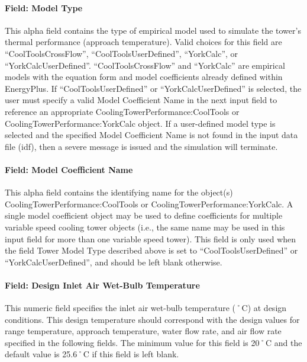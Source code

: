\paragraph{Field: Model Type}\label{field-model-type}

This alpha field contains the type of empirical model used to simulate the tower's thermal performance (approach temperature). Valid choices for this field are ``CoolToolsCrossFlow'', ``CoolToolsUserDefined'', ``YorkCalc'', or ``YorkCalcUserDefined''. ``CoolToolsCrossFlow'' and ``YorkCalc'' are empirical models with the equation form and model coefficients already defined within EnergyPlus. If ``CoolToolsUserDefined'' or ``YorkCalcUserDefined'' is selected, the user must specify a valid Model Coefficient Name in the next input field to reference an appropriate CoolingTowerPerformance:CoolTools or CoolingTowerPerformance:YorkCalc object. If a user-defined model type is selected and the specified Model Coefficient Name is not found in the input data file (idf), then a severe message is issued and the simulation will terminate.

\paragraph{Field: Model Coefficient Name}\label{field-model-coefficient-name}

This alpha field contains the identifying name for the object(s) CoolingTowerPerformance:CoolTools or CoolingTowerPerformance:YorkCalc. A single model coefficient object may be used to define coefficients for multiple variable speed cooling tower objects (i.e., the same name may be used in this input field for more than one variable speed tower). This field is only used when the field Tower Model Type described above is set to ``CoolToolsUserDefined'' or ``YorkCalcUserDefined'', and should be left blank otherwise.

\paragraph{Field: Design Inlet Air Wet-Bulb Temperature}\label{field-design-inlet-air-wet-bulb-temperature}

This numeric field specifies the inlet air wet-bulb temperature (˚C) at design conditions. This design temperature should correspond with the design values for range temperature, approach temperature, water flow rate, and air flow rate specified in the following fields. The minimum value for this field is 20˚C and the default value is 25.6˚C if this field is left blank.

